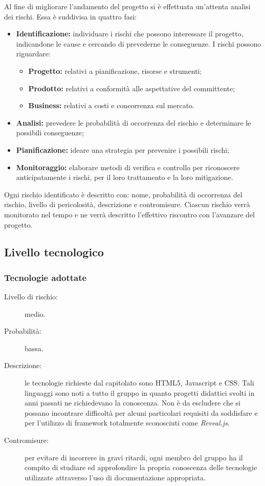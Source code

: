 Al fine di migliorare l'andamento del progetto si è effettuata un'attenta analisi dei rischi. Essa è suddivisa in quattro fasi:
\begin{itemize}
	\item \textbf{Identificazione:} individuare i rischi che possono interessare il progetto, indicandone le cause e cercando di prevederne
	le conseguenze. I rischi possono riguardare:
	\begin{itemize}
		\item \textbf{Progetto:} relativi a pianificazione, risorse e strumenti;
		\item \textbf{Prodotto:} relativi a conformità alle aspettative del committente;
		\item \textbf{Business:} relativi a costi e concorrenza sul mercato.
	\end{itemize}
	\item \textbf{Analisi:} prevedere le probabilità di occorrenza del rischio e determinare le possibili conseguenze;
	\item \textbf{Pianificazione:} ideare una strategia per prevenire i possibili rischi;
	\item \textbf{Monitoraggio:} elaborare metodi di verifica e controllo per riconoscere anticipatamente i rischi, per il loro trattamento e la loro mitigazione.
\end{itemize}
Ogni rischio identificato è descritto con: nome, probabilità di occorrenza del rischio, livello di pericolosità, descrizione e contromisure. Ciascun rischio verrà monitorato nel tempo e ne verrà descritto l'effettivo riscontro con l'avanzare del progetto.

\subsection{Livello tecnologico}
\subsubsection{Tecnologie adottate}
\begin{description}
	\item[Livello di rischio:] medio.
	\item[Probabilità:] bassa.
	\item[Descrizione:] le tecnologie richieste dal capitolato sono HTML5, Javascript e CSS. Tali linguaggi sono noti a tutto il gruppo in quanto progetti didattici svolti in anni passati ne richiedevano la conoscenza. Non è da escludere che si possano incontrare difficoltà per alcuni particolari requisiti da soddisfare e per l'utilizzo di framework totalmente sconosciuti come \textit{Reveal.js}.
	\item[Contromisure:] per evitare di incorrere in gravi ritardi, ogni membro del gruppo ha il compito di studiare ed approfondire la propria conoscenza delle tecnologie utilizzate attraverso l'uso di documentazione appropriata.
\end{description}
